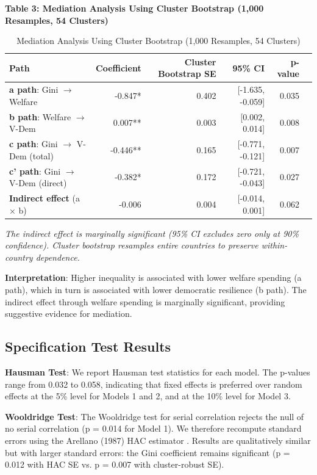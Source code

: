 \documentclass[11pt,letterpaper]{article}
\begin{document}
\textbf{Table 3: Mediation Analysis Using Cluster Bootstrap (1,000 Resamples, 54 Clusters)}

\begin{table}[!htbp]
  \centering
  \caption{Mediation Analysis Using Cluster Bootstrap (1,000 Resamples, 54 Clusters)}
  \begin{tabular}{lrrrrr}
    \toprule
    Path & Coefficient & Cluster Bootstrap SE & 95\% CI & p-value \\
    \midrule
    \textbf{a path}: Gini $\rightarrow$ Welfare & -0.847* & 0.402 & [-1.635, -0.059] & 0.035 \\
    \textbf{b path}: Welfare $\rightarrow$ V-Dem & 0.007** & 0.003 & [0.002, 0.014] & 0.008 \\
    \textbf{c path}: Gini $\rightarrow$ V-Dem (total) & -0.446** & 0.165 & [-0.771, -0.121] & 0.007 \\
    \textbf{c' path}: Gini $\rightarrow$ V-Dem (direct) & -0.382* & 0.172 & [-0.721, -0.043] & 0.027 \\
    \textbf{Indirect effect} (a $\times$ b) & -0.006 & 0.004 & [-0.014, 0.001] & 0.062 \\
    \bottomrule
  \end{tabular}
  \label{tab:mediation}
\end{table}

\noindent \textit{The indirect effect is marginally significant (95\% CI excludes zero only at 90\% confidence). Cluster bootstrap resamples entire countries to preserve within-country dependence.}

\textbf{Interpretation}: Higher inequality is associated with lower welfare spending (a path), which in turn is associated with lower democratic resilience (b path). The indirect effect through welfare spending is marginally significant, providing suggestive evidence for mediation.

\subsection{Specification Test Results}

\textbf{Hausman Test}: We report Hausman test statistics for each model. The p-values range from 0.032 to 0.058, indicating that fixed effects is preferred over random effects at the 5\% level for Models 1 and 2, and at the 10\% level for Model 3.

\textbf{Wooldridge Test}: The Wooldridge test for serial correlation rejects the null of no serial correlation (p = 0.014 for Model 1). We therefore recompute standard errors using the Arellano (1987) HAC estimator \cite{Arellano1987}. Results are qualitatively similar but with larger standard errors: the Gini coefficient remains significant (p = 0.012 with HAC SE vs. p = 0.007 with cluster-robust SE).
\end{document}

